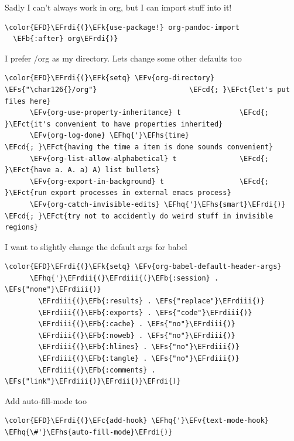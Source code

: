 \documentclass{scrartcl}
\newcommand{\EFk}[1]{\textcolor{EFk}{#1}} %
\newcommand{\EFs}[1]{\textcolor{EFs}{#1}} %
\newcommand{\EFb}[1]{\textcolor{EFb}{#1}} %
\newcommand{\EFct}[1]{\textcolor{EFct}{#1}} %
\newcommand{\EFc}[1]{\textcolor{EFc}{#1}} %
\newcommand{\EFv}[1]{\textcolor{EFv}{#1}} %
\newcommand{\EFcd}[1]{\textcolor{EFcd}{#1}} %
\newcommand{\EFhq}[1]{#1} %
\newcommand{\EFhs}[1]{#1} %
\newcommand{\EFrdi}[1]{#1} %
\newcommand{\EFrdii}[1]{#1} %
\newcommand{\EFrdiii}[1]{#1} %
\begin{document}
Sadly I can't always work in org, but I can import stuff into it!
\begin{Code}
\begin{Verbatim}[]
\color{EFD}\EFrdi{(}\EFk{use-package!} org-pandoc-import
  \EFb{:after} org\EFrdi{)}
\end{Verbatim}
\end{Code}

I prefer /org as my directory. Lets change some other defaults too
\begin{Code}
\begin{Verbatim}[]
\color{EFD}\EFrdi{(}\EFk{setq} \EFv{org-directory} \EFs{"\char126{}/org"}                      \EFcd{; }\EFct{let's put files here}
      \EFv{org-use-property-inheritance} t              \EFcd{; }\EFct{it's convenient to have properties inherited}
      \EFv{org-log-done} \EFhq{'}\EFhs{time}                          \EFcd{; }\EFct{having the time a item is done sounds convenient}
      \EFv{org-list-allow-alphabetical} t               \EFcd{; }\EFct{have a. A. a) A) list bullets}
      \EFv{org-export-in-background} t                  \EFcd{; }\EFct{run export processes in external emacs process}
      \EFv{org-catch-invisible-edits} \EFhq{'}\EFhs{smart}\EFrdi{)}            \EFcd{; }\EFct{try not to accidently do weird stuff in invisible regions}
\end{Verbatim}
\end{Code}

I want to slightly change the default args for babel
\begin{Code}
\begin{Verbatim}[]
\color{EFD}\EFrdi{(}\EFk{setq} \EFv{org-babel-default-header-args}
      \EFhq{'}\EFrdii{(}\EFrdiii{(}\EFb{:session} . \EFs{"none"}\EFrdiii{)}
        \EFrdiii{(}\EFb{:results} . \EFs{"replace"}\EFrdiii{)}
        \EFrdiii{(}\EFb{:exports} . \EFs{"code"}\EFrdiii{)}
        \EFrdiii{(}\EFb{:cache} . \EFs{"no"}\EFrdiii{)}
        \EFrdiii{(}\EFb{:noweb} . \EFs{"no"}\EFrdiii{)}
        \EFrdiii{(}\EFb{:hlines} . \EFs{"no"}\EFrdiii{)}
        \EFrdiii{(}\EFb{:tangle} . \EFs{"no"}\EFrdiii{)}
        \EFrdiii{(}\EFb{:comments} . \EFs{"link"}\EFrdiii{)}\EFrdii{)}\EFrdi{)}
\end{Verbatim}
\end{Code}

Add auto-fill-mode too
\begin{Code}
\begin{Verbatim}[]
\color{EFD}\EFrdi{(}\EFc{add-hook} \EFhq{'}\EFv{text-mode-hook} \EFhq{\#'}\EFhs{auto-fill-mode}\EFrdi{)}
\end{Verbatim}
\end{Code}
\end{document}
